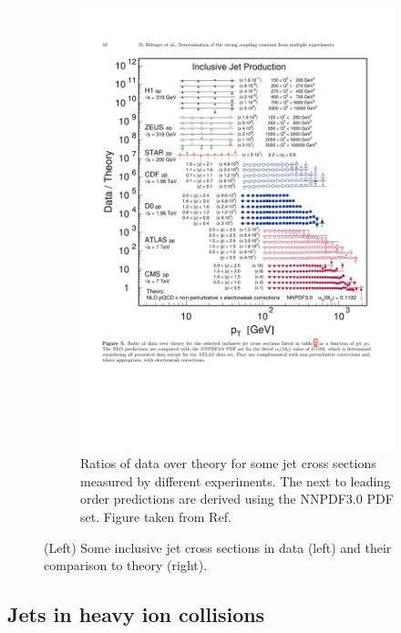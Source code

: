 \begin{figure}
\begin{subfigure}{.45\textwidth}
\end{subfigure}
\qquad  \qquad  
\begin{subfigure}{.45\textwidth}  
  \centering
  \includegraphics[width=\linewidth]{figures/theory/jetcs_pp_theory_comparison}
  \caption{Ratios of data over theory for some jet cross sections measured by different experiments.
  The next to leading order predictions are derived using the NNPDF3.0 PDF set.
  Figure taken from Ref.~\cite{Britzger:2017maj}}
  \label{fig:jetcs_pp_theory_comparison}
\end{subfigure}
\caption{(Left) Some inclusive jet cross sections in data (left) and their comparison to theory (right).}
\label{fig:jetcs}
\end{figure}



\subsection{Jets in heavy ion collisions}

